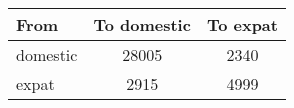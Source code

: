 \begin{tabular}{lcc}
\hline \hline
 From &  To domestic & To expat \\
\hline

domestic & 28005 & 2340 \\ 
expat & 2915 & 4999 \\ 
\hline \hline
\end{tabular}
